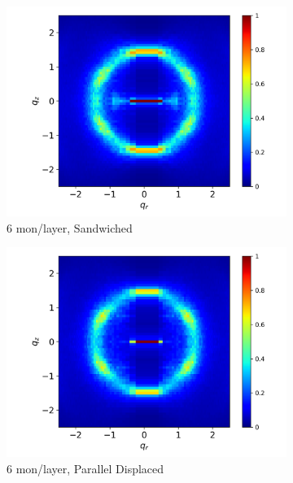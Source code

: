 \documentclass{article}
\begin{document}
\begin{figure}
\begin{subfigure}{0.40\textwidth}
                \centering
                \includegraphics[width=\textwidth]{rzplot_layered_6.png}
                \caption{6 mon/layer, Sandwiched}\label{fig:rzplot_layered_6}
        \end{subfigure}
        \begin{subfigure}{0.40\textwidth}
                \centering
                \includegraphics[width=\textwidth]{rzplot_offset_6.png}
                \caption{6 mon/layer, Parallel Displaced}\label{fig:rzplot_offset_6}
        \end{subfigure}
        \begin{subfigure}{0.40\textwidth}
                \centering

\end{subfigure}
\end{figure}
\end{document}
